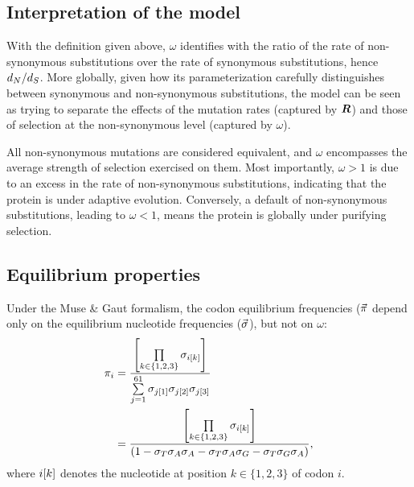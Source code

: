 \subsection{Interpretation of the model}
\label{subsec:interpretation-of-the-model}

With the definition given above, $\omega$ identifies with the ratio of the rate of \gls{non-synonymous} \glspl{substitution} over the rate of \gls{synonymous} \glspl{substitution}, hence $d_N / d_S$.
More globally, given how its parameterization carefully distinguishes between \gls{synonymous} and \gls{non-synonymous} \glspl{substitution}, the model can be seen as trying to separate the effects of the mutation rates (captured by $\bm{R}$) and those of selection at the \gls{non-synonymous} level (captured by $\omega$).

All \gls{non-synonymous} mutations are considered equivalent, and $\omega$ encompasses the average strength of selection exercised on them.
Most importantly, $\omega>1$ is due to an excess in the rate of \gls{non-synonymous} \glspl{substitution}, indicating that the protein is under adaptive evolution.
Conversely, a default of \gls{non-synonymous} \glspl{substitution}, leading to $\omega<1$, means the protein is globally under purifying selection.

\subsection{Equilibrium properties}
\label{subsec:equilibrium-properties}

Under the Muse \& Gaut formalism, the \gls{codon} equilibrium frequencies ($\vec{\pi}$ depend only on the equilibrium nucleotide frequencies ($\vec{\sigma}$), but not on $\omega$:
\begin{align}
    \pi_{{i}} & = \dfrac{\left[\prod\limits_{k \in \{ 1, 2, 3 \}} \sigma_{{i}[k]}\right]}{\sum\limits_{{j}=1}^{61}\sigma_{{j}[1]}\sigma_{{j}[2]}\sigma_{{j}[3]} } \\
    & = \dfrac{\left[\prod\limits_{k \in \{ 1, 2, 3 \}} \sigma_{{i}[k]}\right]}{(1 - \sigma_{T}\sigma_{A}\sigma_{A} - \sigma_{T}\sigma_{A}\sigma_{G} - \sigma_{T}\sigma_{G}\sigma_{A} )}, \label{eq:equilibrium-MG}
\end{align}
where ${i}[k]$ denotes the nucleotide at position $k \in \{ 1, 2, 3 \}$ of \gls{codon} $i$.

